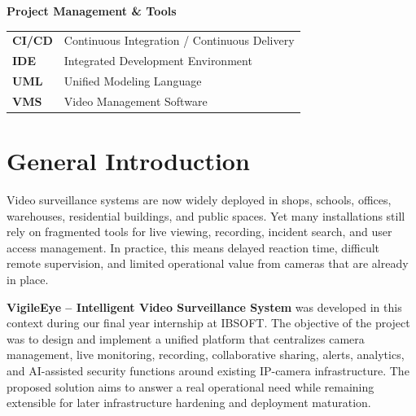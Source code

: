 \documentclass[12pt,a4paper,oneside]{report}
\begin{document}
\vspace{12pt}
\textbf{Project Management \& Tools}\\[4pt]
\begin{tabular}{@{}p{3cm}l@{}}
\textbf{CI/CD}   & Continuous Integration / Continuous Delivery \\
\textbf{IDE}     & Integrated Development Environment \\
\textbf{UML}     & Unified Modeling Language \\
\textbf{VMS}     & Video Management Software \\
\end{tabular}

\newpage{}\setcounter{page}{1}

\chapter*{General Introduction}

\hspace{0.8cm}Video surveillance systems are now widely deployed in shops, schools, offices, warehouses, residential buildings, and public spaces. Yet many installations still rely on fragmented tools for live viewing, recording, incident search, and user access management. In practice, this means delayed reaction time, difficult remote supervision, and limited operational value from cameras that are already in place.

\hspace{0.8cm}\textbf{VigileEye -- Intelligent Video Surveillance System} was developed in this context during our final year internship at IBSOFT. The objective of the project was to design and implement a unified platform that centralizes camera management, live monitoring, recording, collaborative sharing, alerts, analytics, and AI-assisted security functions around existing IP-camera infrastructure. The proposed solution aims to answer a real operational need while remaining extensible for later infrastructure hardening and deployment maturation.
\end{document}
